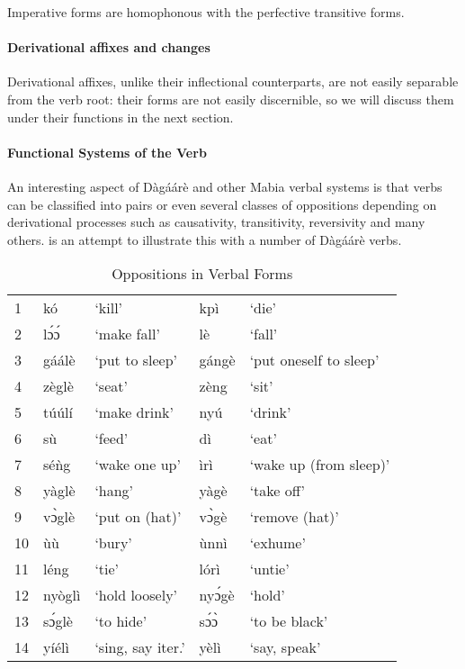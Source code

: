 Imperative forms are homophonous with the perfective transitive forms.

\paragraph{Derivational affixes and changes}

Derivational affixes, unlike their inflectional counterparts, are not easily separable
from the verb root: their forms are not easily discernible, so we will discuss them under their
functions in the next section.

\paragraph{Functional Systems of the Verb}
An interesting aspect of Dàgáárè and other Mabia verbal systems is that verbs can
be classified into pairs or even several classes of oppositions depending on derivational
processes such as causativity, transitivity, reversivity and many others.  is an
attempt to illustrate this with a number of Dàgáárè verbs.

\begin{table}[]
    \centering
    \begin{tabular}{lllll}
1 &kó &‘kill’ &kpì &‘die’\\
2 &lɔ́ɔ́& ‘make fall’& lè& ‘fall’\\
3 &gáálè& ‘put to sleep’& gángè &‘put oneself to sleep’\\
4 &zèglè &‘seat’& zèng &‘sit’\\
5& túúlí& ‘make drink’ &nyú &‘drink’\\
6 &sù &‘feed’ &dì & ‘eat’\\
7& séǹg& ‘wake one up’ &ìrì &‘wake up (from sleep)’\\
8& yàglè& ‘hang’& yàgè& ‘take off’\\
9 &vɔ̀glè &‘put on (hat)’ &vɔ̀gè &‘remove (hat)’\\
10 &ùù &‘bury’ &ùnnì &‘exhume’\\
11 &léng &‘tie’ &lórì &‘untie’\\
12 &nyòglì &‘hold loosely’ &nyɔ́gè &‘hold’\\
13& sɔ́glè &‘to hide’ &sɔ́ɔ̀ &‘to be black’\\
14 &yíélì& ‘sing, say iter.' &yèlì& ‘say, speak’\\
    \end{tabular}
    \caption{Oppositions in Verbal Forms}
    \label{tab:verbOppositions}
\end{table}

